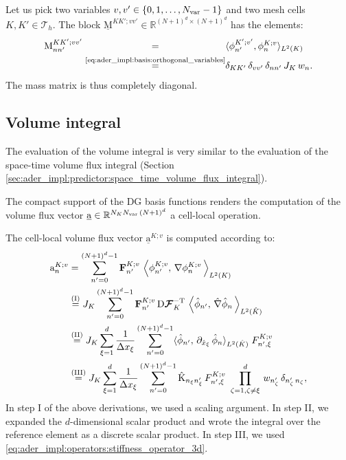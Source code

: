 \documentclass{scrreprt}
\theoremstyle{definition}
\theoremstyle{nonumberplain}
\renewcommand{\vec}[1]{{\textbf{#1}}}
\newcommand{\laVec}[1]{\underline{\mathrm{#1}}}
\newcommand{\laVecel}[1]{\mathrm{#1}}
\newcommand{\laMat}[1]{\underline{\mathrm{#1}}}
\newcommand{\laMatel}[1]{\mathrm{#1}}
\newcommand{\tria}{\mathcal{T}_h}
\newcommand{\cell}{K}
\newcommand{\dV}{\text{d}\vec{x}}
\newcommand{\refVec}[1]{\hat{\vec{#1}}}
\newcommand{\refCell}{\hat{\cell}}
\newcommand{\jacobian}{\textup{D}\boldsymbol{\mathcal{F}}_{\cell}}
\begin{document}
Let us pick two variables $v,v'\in\{0,1,\ldots,N_\textup{var}-1\}$
and two mesh cells $\cell,\cell'\in\tria$.
The block $\laMat{M}^{\cell\cell';vv'}\in\mathbb{R}^{(N+1)^{d}\times(N+1)^{d}}$
has the elements:
\begin{align}
\laMatel{M}^{\cell\cell';vv'}_{nn'}
\overset{\phantom{\textup{\eqref{eq:ader_impl:basis:orthogonal_variables}}}}{=}&
\langle {\phi}^{\cell';v'}_{n'},{\phi}^{\cell;v}_{n}\rangle
_{L^2 (\cell) }\,
\notag
\\
\label{eq:ader_impl:correction:mass_operator}
\overset{\textup{\eqref{eq:ader_impl:basis:orthogonal_variables}}}{=}&
\delta_{\cell\cell'}\,\delta_{vv'}\,\delta_{nn'}\,
J_\cell\,w_{n}.
\end{align}
The mass matrix is thus completely diagonal.

\subsection{Volume integral}
The evaluation of the volume integral is very similar
to the evaluation of the space-time volume flux integral
(Section \ref{sec:ader_impl:predictor:space_time_volume_flux_integral}).

The compact support of the DG basis functions renders the computation of the
volume flux vector $\laVec{a}\in\mathbb{R}^{N_\cell
N_\textup{var}\,(N+1)^d}$ a cell-local operation.

The cell-local volume flux vector $\laVec{a}^{\cell;v}$ is computed
according to:
\begin{align*}
\laVecel{a}^{\cell;v}_{n}
&=
\sum_{n'=0}^{(N+1)^d-1}
\vec{F}^{K;v}_{n'}\,
\left\langle
{\phi}^{K;v}_{n'},\,
\nabla {\phi}^{K;v}_{n}\,
\right\rangle
_{L^2(\cell)}
\\
&\overset{(\textup{I})}
{=}
J_\cell
\sum_{n'=0}^{(N+1)^d-1}
\vec{F}^{K;v}_{n'}\,
\jacobian^{-\textup{T}}\,
\left\langle
\hat{\phi}_{n'},\,
\hat{\nabla}
\hat{\phi}_{n}\,
\right\rangle
_{L^2(\refCell)}
\,
\\
&\overset{(\textup{II})}
{=}
J_\cell
\sum_{\xi=1}^d
\frac{1}{\Delta x_\xi}
\sum_{n'=0}^{(N+1)^d-1}
\langle
\hat{\phi}_{n'},\,
\partial_{\hat{x}_{\xi}}\,\hat{\phi}_{n}
\rangle_{L^2(\refCell)}
\;F^{\cell;v}_{n',\xi}
\\
&\overset{(\textup{III})}
{=}
J_\cell
\sum_{\xi =1}^d
\frac{1}{\Delta x_\xi}
\sum_{n'=0}^{(N+1)^d-1}
\laMatel{\refCell}_{n_\xi n'_\xi}\,
F^{\cell;v}_{n',\xi}\,
\,\prod^{d}_{\zeta=1,\zeta\neq\xi}\,w_{n'_\zeta}\,\delta_{n'_\zeta\,n_\zeta},
\end{align*}
In step I of the above derivations, we used a scaling argument.
In step II, we expanded the $d$-dimensional scalar product and
wrote the integral over the reference element as a discrete scalar product.
In step III, we used \eqref{eq:ader_impl:operators:stiffness_operator_3d}.
\end{document}

